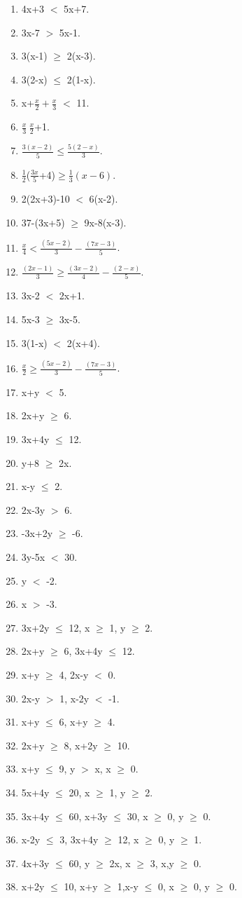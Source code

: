 \begin{enumerate}[label=\arabic*.,ref=\thesubsection.\theenumi]
	\item 4x+3 $<$ 5x+7.
	\item 3x-7 $>$ 5x-1.
	\item 3(x-1) $\geq$ 2(x-3).
	\item 3(2-x) $\leq$ 2(1-x).
	\item x+$\frac{x}{2}+\frac{x}{3}$ $<$ 11.
	\item $\frac{x}{3}\>\frac{x}{2}$+1.
	\item $\frac{3(x-2)}{5}\leq\frac{5(2-x)}{3}$.
	\item $ \frac{1}{2}$($\frac{3x}{5}$+4)$\geq\frac{1}{3}(x-6)$.
	\item 2(2x+3)-10 $<$ 6(x-2).
	\item 37-(3x+5) $\geq$ 9x-8(x-3).
	\item $\frac{x}{4}<\frac{(5x-2)}{3}-\frac{(7x-3)}{5}$.
	\item $\frac{(2x-1)}{3}\geq\frac{(3x-2)}{4}-\frac{(2-x)}{5}$.
	
    \item 3x-2 $<$ 2x+1.
    \item 5x-3 $\geq$ 3x-5.
    \item 3(1-x) $<$ 2(x+4).
    \item $\frac{x}{2}\geq\frac{(5x-2)}{3}-\frac{(7x-3)}{5}$.

    \item x+y $<$ 5.
    \item 2x+y $\geq$ 6.    
    \item 3x+4y $\leq$ 12.
    \item y+8 $\geq$ 2x.
    \item x-y $\leq$ 2.
    \item 2x-3y $>$ 6.
    \item -3x+2y $\geq$ -6.
    \item 3y-5x $<$ 30.
    \item y $<$ -2.
    \item x $>$ -3.
    
    \item 3x+2y $\leq$ 12, x $\geq$ 1, y $\geq$ 2.
    \item 2x+y $\geq$ 6, 3x+4y $\leq$ 12.
    \item x+y $\geq$ 4, 2x-y $<$ 0.
    \item 2x-y $>$ 1, x-2y $<$ -1.
    \item x+y $\leq$ 6, x+y $\geq$ 4.
    \item 2x+y $\geq$ 8, x+2y $\geq$ 10.
    \item x+y $\leq$ 9, y $>$ x, x $\geq$ 0.
    \item 5x+4y $\leq$ 20, x $\geq$ 1, y $\geq$ 2.
    \item 3x+4y $\leq$ 60, x+3y $\leq$ 30, x $\geq$ 0, y $\geq$ 0.
    \item x-2y $\leq$ 3, 3x+4y $\geq$ 12, x $\geq$ 0, y $\geq$ 1.
    \item 4x+3y $\leq$ 60, y $\geq$ 2x, x $\geq$ 3, x,y $\geq$ 0.
    \item x+2y $\leq$ 10, x+y $\geq$ 1,x-y $\leq$ 0, x $\geq$ 0, 
    y $\geq$ 0.
    

\end{enumerate}
